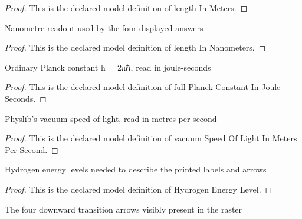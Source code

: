 \begin{proof}
  This is the declared model definition of length In Meters.
\end{proof}
\begin{definition}
  \label{def:physics:phyx-mini-0536:phyxminiproblems-problemphyxmini0536-lengthinnanometers}
  Nanometre readout used by the four displayed answers
\end{definition}
\begin{proof}
  This is the declared model definition of length In Nanometers.
\end{proof}
\begin{definition}
  \label{def:physics:phyx-mini-0536:phyxminiproblems-problemphyxmini0536-fullplanckconstantinjouleseconds}
  Ordinary Planck constant h = 2πℏ, read in joule-seconds
\end{definition}
\begin{proof}
  This is the declared model definition of full Planck Constant In Joule Seconds.
\end{proof}
\begin{definition}
  \label{def:physics:phyx-mini-0536:phyxminiproblems-problemphyxmini0536-vacuumspeedoflightinmeterspersecond}
  Physlib's vacuum speed of light, read in metres per second
\end{definition}
\begin{proof}
  This is the declared model definition of vacuum Speed Of Light In Meters Per Second.
\end{proof}
\begin{definition}
  \label{def:physics:phyx-mini-0536:phyxminiproblems-problemphyxmini0536-hydrogenenergylevel}
  Hydrogen energy levels needed to describe the printed labels and arrows
\end{definition}
\begin{proof}
  This is the declared model definition of Hydrogen Energy Level.
\end{proof}
\begin{definition}
  \label{def:physics:phyx-mini-0536:phyxminiproblems-problemphyxmini0536-balmertransition}
  The four downward transition arrows visibly present in the raster
\end{definition}
